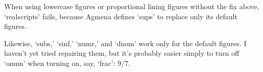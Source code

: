 \documentclass{article}
\begin{document}
When using lowercase figures or proportional lining figures without
the fix above, ‘realscripts’ fails, because Agmena defines ‘sups’ to
replace only its default figures.

Likewise, ‘subs,’ ‘sinf,’ ‘numr,’ and ‘dnom’ work only for the default
figures. I haven’t yet tried repairing them, but it’s probably easier
simply to turn off ‘onum’ when turning on, say, ‘frac’:
{9/7}.
\end{document}
